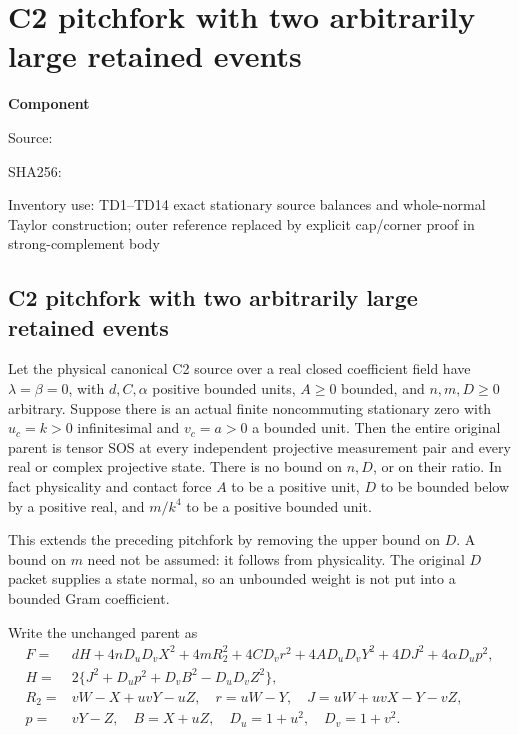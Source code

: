 \chapter{C2 pitchfork with two arbitrarily large retained events}
\label{component:p0c7a15f800d9}
\noindent\textbf{Component }\par
{\small\noindent Source: \par}
{\small\noindent SHA256: \par}
{\small\noindent Inventory use: TD1--TD14 exact stationary source balances and whole-normal Taylor construction; outer reference replaced by explicit cap/corner proof in strong-complement body\par}
\medskip
\section{C2 pitchfork with two arbitrarily large retained events}
\label{p0c7a15f800d9:sec:c2-two-large}

\begin{theorem}
\label{p0c7a15f800d9:thm:c2-two-large}
Let the physical canonical C2 source over a real closed coefficient
field have $\lambda=\beta=0$, with $d,C,\alpha$ positive bounded
units, $A\geq0$ bounded, and $n,m,D\geq0$ arbitrary. Suppose there is
an actual finite noncommuting stationary zero with $u_c=k>0$
infinitesimal and $v_c=a>0$ a bounded unit. Then the entire original
parent is tensor SOS at every independent projective measurement
pair and every real or complex projective state.
There is no bound on $n,D$, or on their ratio. In fact physicality and
contact force $A$ to be a positive unit, $D$ to be bounded below by
a positive real, and $m/k^4$ to be a positive bounded unit.
\end{theorem}

This extends the preceding pitchfork by removing the upper bound on
$D$. A bound on $m$ need not be assumed: it follows from physicality.
The original $D$ packet supplies a state normal, so an unbounded
weight is not put into a bounded Gram coefficient.

Write the unchanged parent as
\[
\begin{split}
F={}&dH+4nD_uD_vX^2+4mR_2^2+4CD_vr^2
       +4AD_uD_vY^2+4DJ^2+4\alpha D_up^2,\\
H={}&2\{J^2+D_up^2+D_vB^2-D_uD_vZ^2\},\\
R_2={}&vW-X+uvY-uZ,\quad r=uW-Y,\quad
J=uW+uvX-Y-vZ,\\
p={}&vY-Z,\quad B=X+uZ,\quad D_u=1+u^2,\quad D_v=1+v^2.
\end{split}                                                    \tag{TD1}
\]

